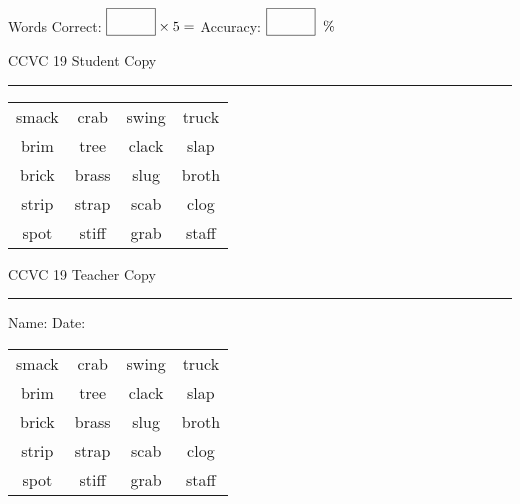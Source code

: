 \documentclass{memoir}
\begin{document}
\normalsize

Words Correct: $\fbox{\phantom{\huge 100}} \times 5 = $ Accuracy: $\fbox{\phantom{\huge 100}}\;\; \%$ 

\vfill

\newpage


\footnotesize \noindent
CCVC 19 \hfill Student Copy
\smallskip
\hrule

\Large

\setlength{\tabcolsep}{14pt}
\def\arraystretch{3}

{\selectfont


\begin{vplace}[0.5]
\begin{center}
\begin{tabular}{cccc}
smack & crab        & swing & truck \\
brim      & tree & clack             & slap            \\
brick       & brass       & slug & broth    \\
strip & strap & scab & clog \\
spot & stiff & grab                    & staff            \\
\end{tabular}
\end{center}
\end{vplace}

}

\newpage

\footnotesize \noindent
CCVC 19 \hfill Teacher Copy
\smallskip
\hrule

\normalsize

\vfill

\noindent
Name: \underline{\hspace{1.75in}} \hfill Date: \underline{\hspace{1in}}

\Large

{\selectfont


\begin{vplace}[0.5]
\begin{center}
\begin{tabular}{cccc}
smack & crab        & swing & truck \\
brim      & tree & clack             & slap            \\
brick       & brass       & slug & broth    \\
strip & strap & scab & clog \\
spot & stiff & grab                    & staff            \\
\end{tabular}
\end{center}
\end{vplace}



}
\end{document}
